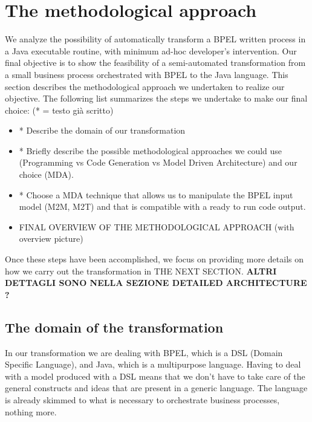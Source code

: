 \section{The methodological approach}
\label{MethodApproach}

We analyze the possibility of automatically transform a BPEL written process in a Java executable routine, with minimum ad-hoc developer’s intervention. Our final objective is to show the feasibility of a semi-automated transformation from a small business process orchestrated with BPEL to the Java language.
This section describes the methodological approach we undertaken to realize our objective. The following list summarizes the steps we undertake to make our final choice: (* = testo già scritto)

\begin{itemize}
 \item * Describe the domain of our transformation
 \item * Briefly describe the possible methodological approaches we could use (Programming vs Code Generation vs Model Driven Architecture) and our choice (MDA). 
 \item * Choose a MDA technique that allows us to manipulate the BPEL input model (M2M, M2T) and that is compatible with a ready to run code output.
 \item FINAL OVERVIEW OF THE METHODOLOGICAL APPROACH (with overview picture)
\end{itemize}  

Once these steps have been accomplished, we focus on providing more details on how we carry out the transformation in THE NEXT SECTION.
\textbf{ALTRI DETTAGLI SONO NELLA SEZIONE DETAILED ARCHITECTURE ? }


\subsection{The domain of the transformation} 
In our transformation we are dealing with BPEL, which is a DSL (Domain Specific Language), and Java, which is a multipurpose language. 
Having to deal with a model produced with a DSL means that   we don't have to take care of the general constructs and ideas that are present in a generic language. The language is already skimmed to what is necessary to orchestrate business processes, nothing more.  %
 
